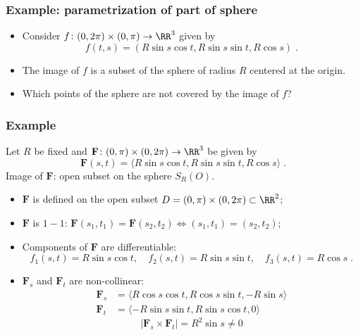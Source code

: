 \begin{frame}
\frametitle{Example: parametrization of part of sphere}
\begin{itemize}
\item Consider $f \colon (0,2\pi) \times (0,\pi) \to \RR^3$ given by
\[f(t,s) = (R\sin{s}\cos{t}, R\sin{s}\sin{t},
R\cos{s}) \; .\]

\item<2-> The image of $f$ is a subset of the
sphere of radius $R$ centered at the origin.

\item<3-> Which points of the sphere are not covered
by the image of $f$?
\end{itemize}
\end{frame}

\begin{frame}
  \frametitle{Example}

  Let $R$ be fixed and
  $\textbf{F} \colon (0,\pi)\times (0,2\pi) \to \RR^3$ be given by
%
$$\textbf{F}(s,t) = \langle R\sin{s}\cos{t}, R\sin{s}\sin{t}, R\cos{s}\rangle \; .$$
%
Image of $\textbf{F}$: \pause open subset on the sphere $S_R(O)$.\pause

\begin{itemize}
  \item  $\textbf{F}$ is defined on the open subset \pause $D= (0,\pi) \times (0,2\pi) \subset \RR^2$;\pause
  \item $\textbf{F}$ is $1-1$: \pause $\textbf{F}(s_1,t_1) = \textbf{F}(s_2,t_2) \Longleftrightarrow (s_1,t_1) = (s_2,t_2)$;\pause
  \item Components of $\textbf{F}$ are differentiable:\pause
  $$f_1(s,t) = R\sin{s}\cos{t}, \quad
  f_2(s,t) = R\sin{s}\sin{t}, \quad
  f_3(s,t) = R\cos{s}\; .$$
  \item \pause $\textbf{F}_s$ and $\textbf{F}_t$ are non-collinear:\pause
  \begin{align*}
    \textbf{F}_s & = \langle R\cos{s}\cos{t}, R\cos{s}\sin{t}, -R\sin{s} \rangle \\
    \textbf{F}_t & = \langle -R\sin{s}\sin{t}, R\sin{s}\cos{t}, 0 \rangle
  \end{align*}
%
$$|\textbf{F}_s \times \textbf{F}_t| = R^2\sin{s} \neq 0 $$
\end{itemize}

\end{frame}